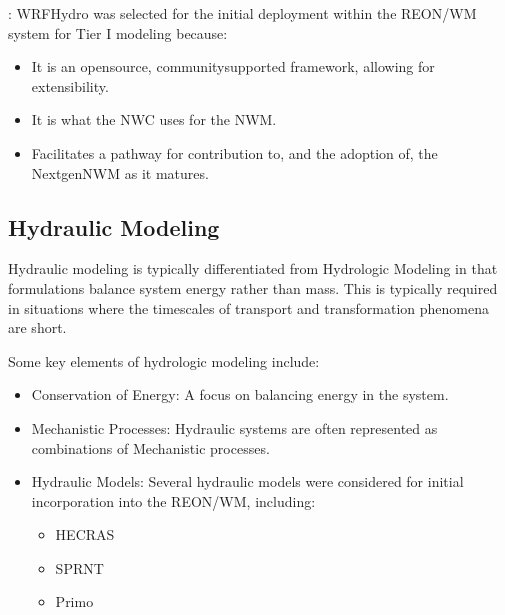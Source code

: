 \documentclass[letterpaper,12pt,english]{sphinxmanual}
\begin{document}
\sphinxAtStartPar
{}: WRF\sphinxhyphen{}Hydro was selected for the initial deployment within the REON/WM system for Tier I modeling because:
\begin{itemize}
\item {} 
\sphinxAtStartPar
It is an open\sphinxhyphen{}source, community\sphinxhyphen{}supported framework, allowing for extensibility.

\item {} 
\sphinxAtStartPar
It is what the NWC uses for the NWM.

\item {} 
\sphinxAtStartPar
Facilitates a pathway for contribution to, and the adoption of, the Nextgen\sphinxhyphen{}NWM as it matures.

\end{itemize}

\subsection{Hydraulic Modeling}
\label{\detokenize{requirements/knowledge/hydraulic:hydraulic-modeling}}\label{\detokenize{requirements/knowledge/hydraulic::doc}}
\sphinxAtStartPar
Hydraulic modeling is typically differentiated from Hydrologic Modeling in that formulations balance system energy rather than mass. This is typically required in situations where the timescales of transport and transformation phenomena are short.

\sphinxAtStartPar
Some key elements of hydrologic modeling include:
\begin{itemize}
\item {} 
\sphinxAtStartPar
Conservation of Energy: A focus on balancing energy in the system.

\item {} 
\sphinxAtStartPar
Mechanistic Processes: Hydraulic systems are often represented as combinations of Mechanistic processes.

\item {} 
\sphinxAtStartPar
Hydraulic Models: Several hydraulic models were considered for initial incorporation into the REON/WM, including:
\begin{itemize}
\item {} 
\sphinxAtStartPar
HEC\sphinxhyphen{}RAS

\item {} 
\sphinxAtStartPar
SPRNT

\item {} 
\sphinxAtStartPar
Primo

\end{itemize}

\end{itemize}
\end{document}
